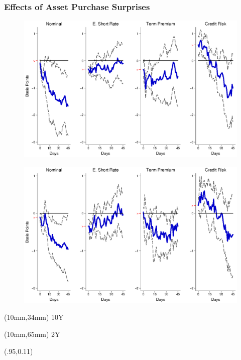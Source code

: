 \documentclass[12pt, aspectratio=169, xcolor=dvipsnames]{beamer}  %
\begin{document}
\begin{frame}[label=LSAPEM]
	\frametitle{Effects of Asset Purchase Surprises}
	\begin{figure}[!htbp]
		\begin{center} %
			\includegraphics[trim={0cm 0cm 0cm 0cm},clip,height=0.4\textheight,width=0.85\linewidth]{../Figures/LPs/LagDep-FX/LSAP/EM/LSAPEMnomyptpphi120m.eps}
			\par\end{center}
	\end{figure}
	\vspace{-0.5cm}
	\begin{figure}[!htbp]
		\begin{center} %
			\includegraphics[trim={0cm 0cm 0cm 0.76cm},clip,height=0.4\textheight,width=0.85\linewidth]{../Figures/LPs/LagDep-FX/LSAP/EM/LSAPEMnomyptpphi24m.eps}
			\par\end{center}
	\end{figure}
	\begin{textblock*}{8mm}(10mm,34mm)
		\small 10Y
	\end{textblock*}
	\begin{textblock*}{8mm}(10mm,65mm)
		\small 2Y
	\end{textblock*}
	\begin{textblock*}{5cm}(.95\textwidth,0.11\textheight)
		\hyperlink{LSAPUS}{}
	\end{textblock*}
\end{frame}
\end{document}
